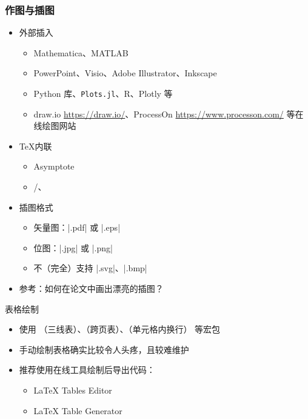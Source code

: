       \begin{frame}[fragile]
        \frametitle{作图与插图}
        \begin{itemize}
          \item 外部插入
      
            \begin{itemize}
              \item Mathematica、MATLAB
              \item PowerPoint、Visio、Adobe Illustrator、Inkscape
              \item Python  库、\texttt{Plots.jl}、R、Plotly 等
              \item draw.io \url{https://draw.io/}、ProcessOn \url{https://www.processon.com/} 等在线绘图网站
            \end{itemize}
      
          \item \TeX 内联
      
            \begin{itemize}
              \item Asymptote
              \item \alert{/、}
            \end{itemize}
      
          \item 插图格式
      
            \begin{itemize}
              \item 矢量图：|.pdf| 或 |.eps|
              \item 位图：|.jpg| 或 |.png|
              \item 不（完全）支持 |.svg|、|.bmp|
            \end{itemize}
      
          \item 参考：如何在论文中画出漂亮的插图？
        \end{itemize}
      \end{frame}
      
      \begin{frame}[fragile]{表格绘制}
        \begin{itemize}
          \item 使用 （三线表）、（跨页表）、（单元格内换行） 等宏包
          \item 手动绘制表格确实比较令人头疼，且较难维护
          \item 推荐使用在线工具绘制后导出代码：
            \begin{itemize}
              \item \LaTeX{} Tables Editor 
              \item \LaTeX{} Table Generator 
            \end{itemize}
        \end{itemize}
      \end{frame}
      


